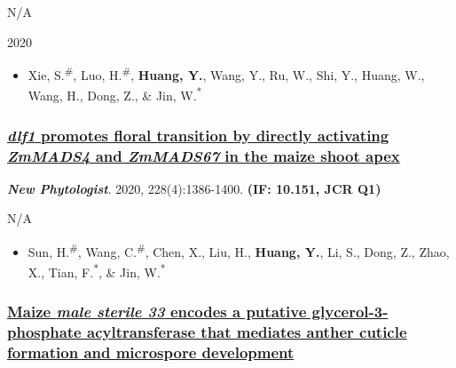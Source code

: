 \documentclass[]{article}
\providecommand{\tightlist}{%
  \setlength{\itemsep}{0pt}\setlength{\parskip}{0pt}}
\begin{document}
N/A

2020

\begin{itemize}
\tightlist
\item
  Xie, S.\textsuperscript{\#}, Luo, H.\textsuperscript{\#},
  \textbf{Huang, Y.}, Wang, Y., Ru, W., Shi, Y., Huang, W., Wang, H.,
  Dong, Z., \& Jin, W.\textsuperscript{*}
\end{itemize}

\hypertarget{dlf1-promotes-floral-transition-by-directly-activating-zmmads4-and-zmmads67-in-the-maize-shoot-apex}{%
\subsubsection{\texorpdfstring{\href{https://dx.doi.org/10.1111/nph.16772}{\emph{dlf1}
promotes floral transition by directly activating \emph{ZmMADS4} and
\emph{ZmMADS67} in the maize shoot
apex}}{dlf1 promotes floral transition by directly activating ZmMADS4 and ZmMADS67 in the maize shoot apex}}\label{dlf1-promotes-floral-transition-by-directly-activating-zmmads4-and-zmmads67-in-the-maize-shoot-apex}}

\textbf{\emph{New Phytologist}}. 2020, 228(4):1386-1400. \textbf{(IF:
10.151, JCR Q1)}

N/A

\begin{itemize}
\tightlist
\item
  Sun, H.\textsuperscript{\#}, Wang, C.\textsuperscript{\#}, Chen, X.,
  Liu, H., \textbf{Huang, Y.}, Li, S., Dong, Z., Zhao, X., Tian,
  F.\textsuperscript{*}, \& Jin, W.\textsuperscript{*}
\end{itemize}

\hypertarget{maize-male-sterile-33-encodes-a-putative-glycerol-3-phosphate-acyltransferase-that-mediates-anther-cuticle-formation-and-microspore-development}{%
\subsubsection{\texorpdfstring{\href{https://doi.org/10.1186/s12870-018-1543-7}{Maize
\emph{male sterile 33} encodes a putative glycerol-3-phosphate
acyltransferase that mediates anther cuticle formation and microspore
development}}{Maize male sterile 33 encodes a putative glycerol-3-phosphate acyltransferase that mediates anther cuticle formation and microspore development}}\label{maize-male-sterile-33-encodes-a-putative-glycerol-3-phosphate-acyltransferase-that-mediates-anther-cuticle-formation-and-microspore-development}}
\end{document}
